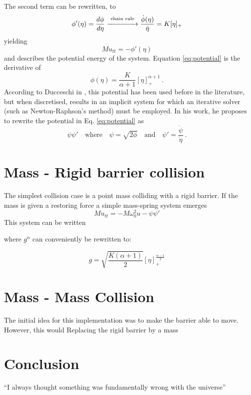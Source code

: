 \documentclass{article}
\begin{document}
\noindent The second term can be rewritten, to 
\begin{equation}\label{eq:potential}
    \phi'(\eta) = \frac{d\phi}{d\eta}\overset{\text{chain rule}}{\xrightarrow{\hspace*{1.4cm}}}  \frac{\dot{\phi}(\eta)}{\dot{\eta}} =  K[\eta]_+
\end{equation}
yielding
\begin{equation}
    Mu_{tt} = -\phi'(\eta)
\end{equation}
and describes the potential energy of the system. Equation \eqref{eq:potential} is the derivative of
\begin{equation}
    \phi(\eta) = \frac{K}{\alpha+1}[\eta]_+^{\alpha + 1}\ .
\end{equation}
%
According to Ducceschi in \cite{Ducceschi2019}, this potential has been used before in the literature, but when discretised, results in an implicit system for which an iterative solver (such as Newton-Raphson's method) must be employed. In his work, he proposes to rewrite the potential in Eq. \eqref{eq:potential} as
\begin{equation}
    \psi\psi' \quad \text{where} \quad \psi = \sqrt{2\phi} \quad \text{and} \quad \psi' = \frac{\dot{\psi}}{\dot{\eta}}\ .
\end{equation}
\section{Mass - Rigid barrier collision}
The simplest collision case is a point mass colliding with a rigid barrier. If the mass is given a restoring force a simple mass-spring system emerges
\begin{equation}\label{eq:massSpringBarrier}
    Mu_{tt} = -M\omega_0^2u - \psi\psi'
\end{equation}
This system can be written 


where $g^n$ can conveniently be rewritten to:

\begin{equation}
    g = \sqrt{\frac{K(\alpha+1)}{2}}[\eta]_+^{\frac{\alpha-1}{2}}
\end{equation}


\section{Mass - Mass Collision}
The initial idea for this implementation was to make the barrier able to move. However, this would 
Replacing the rigid barrier by a mass


 
\section{Conclusion}
``I always thought something was fundamentally wrong with the universe'' \citep{adams1995hitchhiker}



\end{document}
